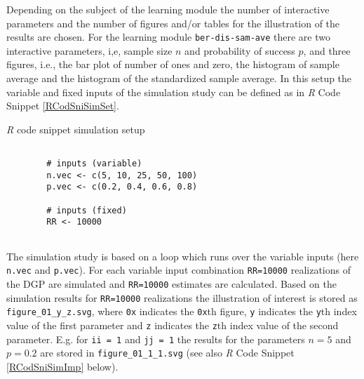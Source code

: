 \documentclass[12pt]{article}
\begin{document}
Depending on the subject of the learning module the number of interactive parameters and the number of figures and/or tables for the illustration of the results are chosen. 
%
For the learning module \texttt{ber-dis-sam-ave} there are two interactive parameters, i,e, sample size $n$ and probability of success $p$, and three figures, i.e., the bar plot of number of ones and zero, the histogram of sample average and the histogram of the standardized sample average. 
%
In this setup the variable and fixed inputs of the simulation study can be defined as in \emph{R} Code Snippet \ref{RCodSniSimSet}. 
%
\begin{CodeSnippet}[!hp]
	\centering
	\caption{\emph{R} code snippet simulation setup}
	\normalsize
	\vspace{0.25cm}
	\begin{BVerbatim}
		
		# inputs (variable)
		n.vec <- c(5, 10, 25, 50, 100)
		p.vec <- c(0.2, 0.4, 0.6, 0.8)
		
		# inputs (fixed)
		RR <- 10000
		
	\end{BVerbatim}
	\label{RCodSniSimSet}
\end{CodeSnippet}
%
The simulation study is based on a loop which runs over the variable inputs (here \texttt{n.vec} and \texttt{p.vec}). 
%
For each variable input combination \texttt{RR=10000} realizations of the DGP are simulated and \texttt{RR=10000} estimates are calculated. 
%
Based on the simulation results for \texttt{RR=10000} realizations the illustration of interest is stored as \texttt{figure\_01\_y\_z.svg}, where \texttt{0x} indicates the \texttt{0x}th figure, \texttt{y} indicates the \texttt{y}th index value of the first parameter and \texttt{z} indicates the \texttt{z}th index value of the second parameter. 
%
E.g. for \texttt{ii =  1} and \texttt{jj = 1} the results for the parameters $n=5$ and $p=0.2$ are stored in \texttt{figure\_01\_1\_1.svg} (see also \emph{R} Code Snippet \ref{RCodSniSimImp} below).%
%
\end{document}
